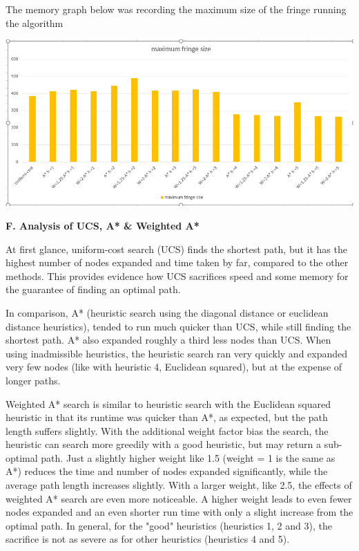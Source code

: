 \documentclass[12pt, letterpaper]{article}
\begin{document}
\medskip

The memory graph below was recording the maximum size of the fringe running the algorithm

\medskip

\noindent \includegraphics[scale=0.65]{"avg-mem"}

\medskip

\pagebreak %

\noindent \textbf{F. Analysis of UCS, A* \& Weighted A*}

At first glance, uniform-cost search (UCS) finds the shortest path, but it has the highest number of nodes expanded and time taken by far, compared to the other methods. This provides evidence how UCS sacrifices speed and some memory for the guarantee of finding an optimal path.

In comparison, A* (heuristic search using the diagonal distance or euclidean distance heuristics),  tended to run much quicker than UCS, while still finding the shortest path. A* also expanded roughly a third less nodes than UCS. When using inadmissible heuristics, the heuristic search ran very quickly and expanded very few nodes (like with heuristic 4, Euclidean squared), but at the expense of longer paths.

Weighted A* search is similar to heuristic search with the Euclidean squared heuristic in that its runtime was quicker than A*, as expected, but the path length suffers slightly. With the additional weight factor bias the search, the heuristic can search more greedily with a good heuristic, but may return a sub-optimal path. Just a slightly higher weight like 1.5 (weight = 1 is the same as A*) reduces the time and number of nodes expanded significantly, while the average path length increases slightly. With a larger weight, like 2.5, the effects of weighted A* search are even more noticeable. A higher weight leads to even fewer nodes expanded and an even shorter run time with only a slight increase from the optimal path. In general, for the "good" heuristics (heuristics 1, 2 and 3), the sacrifice is not as severe as for other heuristics (heuristics 4 and 5). \newline
\end{document}
